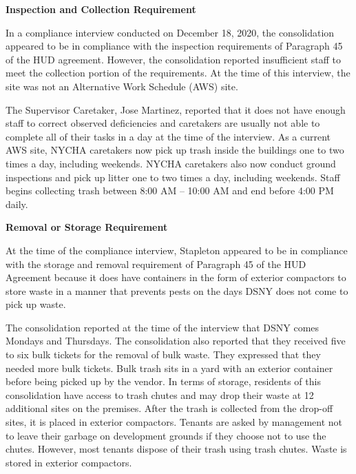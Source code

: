  

\textbf{Inspection and Collection Requirement} 

In a compliance interview conducted on December 18, 2020, the consolidation appeared to be in compliance with the inspection requirements of Paragraph 45 of the HUD agreement. However, the consolidation reported insufficient staff to meet the collection portion of the requirements. At the time of this interview, the site was not an Alternative Work Schedule (AWS) site. 

The Supervisor Caretaker, Jose Martinez, reported that it does not have enough staff to correct observed deficiencies and caretakers are  usually not able to complete all of their tasks in a day at the time of the interview. As a current AWS site, NYCHA caretakers now pick up trash inside the buildings one to two times a day, including weekends.  NYCHA caretakers also now conduct ground inspections and pick up litter one to two times a day, including weekends. Staff begins collecting trash between 8:00 AM -- 10:00 AM and end before 4:00 PM daily. 

 

\textbf{Removal or Storage Requirement} 

 

At the time of the compliance interview, Stapleton appeared to be in compliance with the storage and removal requirement of Paragraph 45 of the HUD Agreement because it does have containers in the form of exterior compactors to store waste in a manner that prevents pests on the days DSNY does not come to pick up waste. 

  

The consolidation reported at the time of the interview that DSNY comes Mondays and Thursdays. The consolidation also reported that they received five to six bulk tickets for the removal of bulk waste. They expressed that they needed more bulk tickets. Bulk trash sits in a yard with an exterior container before being picked up by the vendor.  In terms of storage, residents of this consolidation have access to trash chutes and may drop their waste at 12 additional sites on the premises. After the trash is collected from the drop-off sites, it is placed in exterior compactors. Tenants are asked by management not to leave their garbage on development grounds if they choose not to use the chutes. However, most tenants dispose of their trash using trash chutes. Waste is stored in exterior compactors.

 

